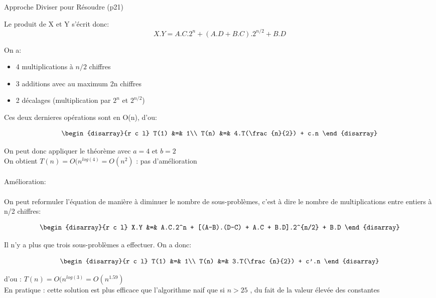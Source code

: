 \begin{exercice}{Approche Diviser pour Résoudre (p21)}

Le produit de X et Y s'écrit donc:
\[
X.Y = A.C.2^n + (A.D + B.C).2^{n/2}+B.D
\]

On a:
\begin{itemize}
\item 4 multiplications à $n/2$ chiffres
\item 3 additions avec au maximum 2n chiffres
\item 2 décalages (multiplication par $2^n$ et $2^{n/2}$)
\end{itemize}

Ces deux dernieres opérations sont en O(n), d'ou:

\[
\begin{disarray}{r c l}
T(1) &=& 1\\
T(n) &=& 4.T(\frac{n}{2}) + c.n
\end{disarray}
\]

On peut donc appliquer le théorème avec $a = 4$ et $b = 2$\\
On obtient $T(n) = O(n^{log(4)} = O(n^2)$ : pas d'amélioration
\\\\
Amélioration:\\\\
On peut reformuler l'équation de manière à diminuer le nombre de sous-problèmes, c'est à dire le nombre de multiplications entre entiers à n/2 chiffres:

\[
\begin{disarray}{r c l}
X.Y &=& A.C.2^n + [(A-B).(D-C) + A.C + B.D].2^{n/2} + B.D
\end{disarray}
\]

Il n'y a plus que trois sous-problèmes a effectuer. On a donc:

\[
\begin{disarray}{r c l}
T(1) &=& 1\\
T(n) &=& 3.T(\frac{n}{2}) + c'.n
\end{disarray}
\]

d'ou : $T(n) = O(n^{log(3)} = O(n^{1.59})$\\
En pratique : cette solution est plus efficace que l'algorithme naif que si $n > 25$ , du fait de la valeur élevée des constantes


\end{exercice}

